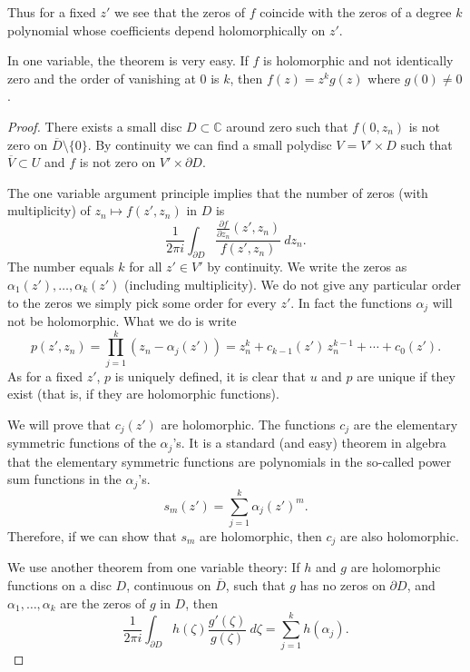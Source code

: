 \documentclass[12pt,openany]{book}
\newcommand{\C}{{\mathbb{C}}}
\theoremstyle{plain}
\theoremstyle{remark}
\theoremstyle{definition}
\theoremstyle{exercise}
\theoremstyle{example}
\begin{document}
Thus for a fixed $z'$ we see that the zeros of $f$ coincide with the zeros
of a degree $k$ polynomial whose coefficients depend holomorphically on $z'$.

In one variable, the theorem is very easy.  If $f$ is holomorphic and not
identically zero and the order of vanishing at 0 is $k$, then $f(z) = z^k
g(z)$ where $g(0) \not= 0$.

\begin{proof}
There exists a small disc $D \subset \C$ around zero such that
$f(0,z_n)$ is not zero on $\overline{D} \setminus \{ 0 \}$.  By continuity
we can find a small polydisc $V = V' \times D$ such that
$\overline{V} \subset U$ and $f$ is not zero on
$V' \times \partial D$.

The one variable argument principle implies that the number of zeros (with
multiplicity) of $z_n
\mapsto f(z',z_n)$ in $D$ is
\begin{equation}
\frac{1}{2\pi i}
\int_{\partial D}
\frac{\frac{\partial f}{\partial z_n} (z',z_n)}{f(z',z_n)} ~dz_n .
\end{equation}
The number equals $k$ for all $z' \in V'$ by continuity.  We
write the zeros as $\alpha_1(z'),\ldots,\alpha_k(z')$ (including
multiplicity).  We do not give any particular order to the zeros
we simply pick some order for every $z'$.
In fact the functions $\alpha_j$ will not be holomorphic.  What we do is
write
\begin{equation}
p(z',z_n)
=
\prod_{j=1}^k (z_n-\alpha_j(z'))
=
z_n^k + c_{k-1}(z') \, z_n^{k-1} + \cdots + c_0 (z') .
\end{equation}
As for a fixed $z'$, $p$ is uniquely defined, it is
clear that
$u$ and $p$ are unique if they exist (that is, if they are holomorphic
functions).

We will prove that $c_j(z')$ are holomorphic.  The functions $c_j$ are
the elementary symmetric functions of the $\alpha_j$'s.  It is a standard (and
easy) theorem in algebra that the elementary symmetric functions are
polynomials in the so-called power sum functions in the $\alpha_j$'s.
\begin{equation}
s_m(z') = \sum_{j=1}^k {\alpha_j(z')}^m .
\end{equation}
Therefore, if we can show that $s_m$ are holomorphic, then $c_j$ are also
holomorphic.

We use another theorem from one variable theory: If $h$ and $g$ are
holomorphic functions on a disc $D$, continuous on $\overline{D}$,
such that $g$ has no zeros on $\partial D$, and $\alpha_1,\ldots,\alpha_k$
are the zeros of $g$ in $D$, then
\begin{equation}
\frac{1}{2 \pi i}
\int_{\partial D} h(\zeta) \frac{g'(\zeta)}{g(\zeta)} ~d\zeta
= \sum_{j=1}^k h(\alpha_j) .
\end{equation}


\end{proof}
\end{document}
